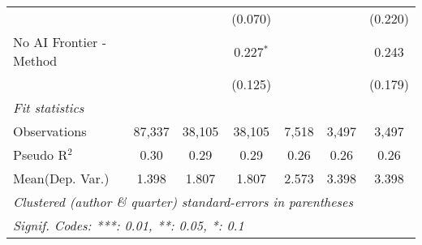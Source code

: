 \begin{tabular}{lcccccc}
                           &               &               & (0.070)       &               &              & (0.220)\\   
   No AI Frontier - Method &               &               & 0.227$^{*}$   &               &              & 0.243\\   
                           &               &               & (0.125)       &               &              & (0.179)\\   
   \midrule
   \emph{Fit statistics}\\
   Observations            & 87,337        & 38,105        & 38,105        & 7,518         & 3,497        & 3,497\\  
   Pseudo R$^2$            & 0.30          & 0.29          & 0.29          & 0.26          & 0.26         & 0.26\\  
Mean(Dep. Var.) & 1.398 & 1.807 & 1.807 & 2.573 & 3.398 & 3.398 \\
   \midrule \midrule
   \multicolumn{7}{l}{\emph{Clustered (author \& quarter) standard-errors in parentheses}}\\
   \multicolumn{7}{l}{\emph{Signif. Codes: ***: 0.01, **: 0.05, *: 0.1}}\\
\end{tabular}
\par\endgroup
